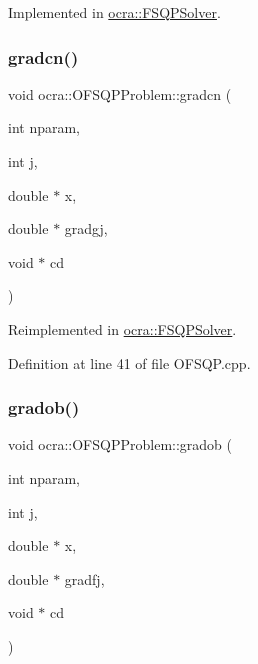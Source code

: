 Implemented in \hyperlink{classocra_1_1FSQPSolver_ae989c0c32f87ea5e4e5a85e11683fcff}{ocra\+::\+F\+S\+Q\+P\+Solver}.

\hypertarget{classocra_1_1OFSQPProblem_ab89eefbaf9b86a89a0ceede0b4b61284}{}\label{classocra_1_1OFSQPProblem_ab89eefbaf9b86a89a0ceede0b4b61284} 
\subsubsection{\texorpdfstring{gradcn()}{gradcn()}}
{\footnotesize\ttfamily void ocra\+::\+O\+F\+S\+Q\+P\+Problem\+::gradcn (\begin{DoxyParamCaption}\item[{int}]{nparam,  }\item[{int}]{j,  }\item[{double $\ast$}]{x,  }\item[{double $\ast$}]{gradgj,  }\item[{void $\ast$}]{cd }\end{DoxyParamCaption})\hspace{0.3cm}{\ttfamily [virtual]}}



Reimplemented in \hyperlink{classocra_1_1FSQPSolver_aea97ea5c3c2480976ad27c190b60077d}{ocra\+::\+F\+S\+Q\+P\+Solver}.



Definition at line 41 of file O\+F\+S\+Q\+P.\+cpp.

\hypertarget{classocra_1_1OFSQPProblem_a1300d237d9b87df1f71db7129c38458a}{}\label{classocra_1_1OFSQPProblem_a1300d237d9b87df1f71db7129c38458a} 
\subsubsection{\texorpdfstring{gradob()}{gradob()}}
{\footnotesize\ttfamily void ocra\+::\+O\+F\+S\+Q\+P\+Problem\+::gradob (\begin{DoxyParamCaption}\item[{int}]{nparam,  }\item[{int}]{j,  }\item[{double $\ast$}]{x,  }\item[{double $\ast$}]{gradfj,  }\item[{void $\ast$}]{cd }\end{DoxyParamCaption})\hspace{0.3cm}{\ttfamily [virtual]}}



